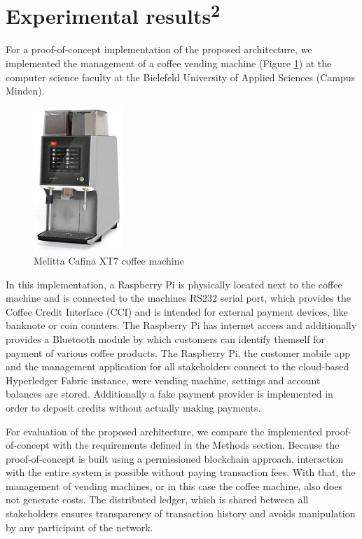 \section{Experimental results\textsuperscript{2}}
For a proof-of-concept implementation of the proposed architecture, we implemented the management of a coffee vending machine (Figure \ref{fig:coffeemachine}) at the computer science faculty at the Bielefeld University of Applied Sciences (Campus Minden).
\begin{figure}[ht]
    \centering
    \includegraphics[width=0.3\textwidth]{assets/cafina-xt7.png}
    \caption{Melitta Cafina XT7 coffee machine}
    \label{fig:coffeemachine}
\end{figure}
In this implementation, a Raspberry Pi is physically located next to the coffee machine and is connected to the machines RS232 serial port, which provides the Coffee Credit Interface (CCI) \cite{csi:online} and is intended for external payment devices, like banknote or coin counters.
The Raspberry Pi has internet access and additionally provides a Bluetooth module by which customers can identify themself for payment of various coffee products.
The Raspberry Pi, the customer mobile app and the management application for all stakeholders connect to the cloud-based Hyperledger Fabric instance, were vending machine, settings and account balances are stored. Additionally a fake payment provider is implemented in order to deposit credits without actually making payments.

For evaluation of the proposed architecture, we compare the implemented proof-of-concept with the requirements defined in the Methods section.
Because the proof-of-concept is built using a permissioned blockchain approach, interaction with the entire system is possible without paying transaction fees. With that, the management of vending machines, or in this case the coffee machine, also does not generate costs. The distributed ledger, which is shared between all stakeholders ensures transparency of transaction history and avoids manipulation by any participant of the network.

